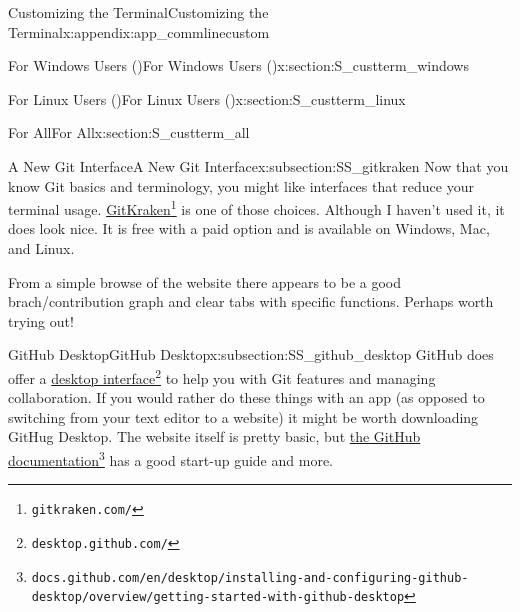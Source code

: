 \documentclass[oneside,10pt,]{book}
\begin{document}
\begin{appendixptx}{Customizing the Terminal}{}{Customizing the Terminal}{}{}{x:appendix:app_commlinecustom}
\typeout{************************************************}
%
\begin{sectionptx}{For Windows Users (\textasteriskcentered{})}{}{For Windows Users (\textasteriskcentered{})}{}{}{x:section:S_custterm_windows}
%
\end{sectionptx}
%
%
\typeout{************************************************}
\typeout{************************************************}
%
\begin{sectionptx}{For Linux Users (\textasteriskcentered{})}{}{For Linux Users (\textasteriskcentered{})}{}{}{x:section:S_custterm_linux}
%
\end{sectionptx}
%
%
\typeout{************************************************}
\typeout{************************************************}
%
\begin{sectionptx}{For All}{}{For All}{}{}{x:section:S_custterm_all}
%
%
\typeout{************************************************}
\typeout{************************************************}
%
\begin{subsectionptx}{A New Git Interface}{}{A New Git Interface}{}{}{x:subsection:SS_gitkraken}
%
%
Now that you know Git basics and terminology, you might like interfaces that reduce your terminal usage. \href{https://www.gitkraken.com/}{GitKraken}\footnote{\nolinkurl{gitkraken.com/}\label{g:fn:idm479219944}} is one of those choices. Although I haven't used it, it does look nice. It is free with a paid option and is available on Windows, Mac, and Linux.%
\par
From a simple browse of the website there appears to be a good brach\slash{}contribution graph and clear tabs with specific functions. Perhaps worth trying out!%
\end{subsectionptx}
%
%
\typeout{************************************************}
\typeout{************************************************}
%
\begin{subsectionptx}{GitHub Desktop}{}{GitHub Desktop}{}{}{x:subsection:SS_github_desktop}
%
%
GitHub does offer a \href{https://desktop.github.com/}{desktop interface}\footnote{\nolinkurl{desktop.github.com/}\label{g:fn:idm479210344}} to help you with Git features and managing collaboration. If you would rather do these things with an app (as opposed to switching from your text editor to a website) it might be worth downloading GitHug Desktop. The website itself is pretty basic, but \href{https://docs.github.com/en/desktop/installing-and-configuring-github-desktop/overview/getting-started-with-github-desktop}{the GitHub documentation}\footnote{\nolinkurl{docs.github.com/en/desktop/installing-and-configuring-github-desktop/overview/getting-started-with-github-desktop}\label{g:fn:idm479211624}} has a good start-up guide and more.%

\end{subsectionptx}
\end{sectionptx}
\end{appendixptx}
\end{document}
